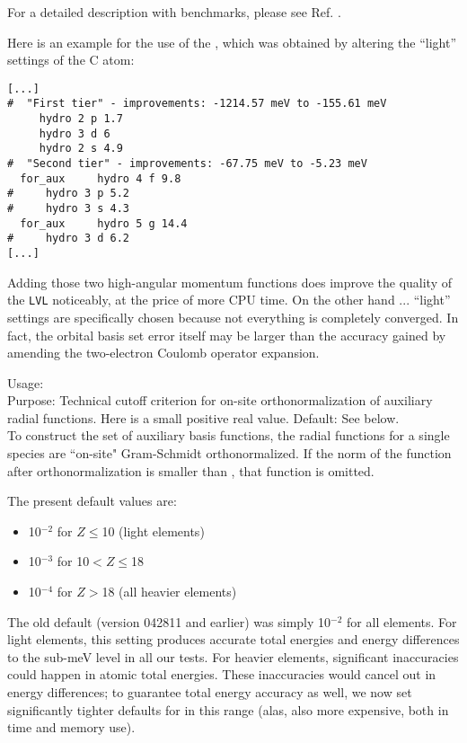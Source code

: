 For a detailed description with benchmarks, please see
Ref. \cite{Ihrig2015}. 

Here is an example for the use of the ,
which was obtained by altering the ``light'' settings of the C atom:

\small
\begin{verbatim}
[...]
#  "First tier" - improvements: -1214.57 meV to -155.61 meV
     hydro 2 p 1.7
     hydro 3 d 6
     hydro 2 s 4.9
#  "Second tier" - improvements: -67.75 meV to -5.23 meV
  for_aux     hydro 4 f 9.8
#     hydro 3 p 5.2
#     hydro 3 s 4.3
  for_aux     hydro 5 g 14.4
#     hydro 3 d 6.2
[...]
\end{verbatim}
\normalsize

Adding those two high-angular momentum functions does improve the
quality of the  \texttt{LVL} noticeably, at the
price of more CPU time. On the other hand ... ``light'' settings are
specifically chosen because not everything is completely converged. In
fact, the orbital basis set error itself may be larger than the
accuracy gained by amending the two-electron Coulomb operator
expansion. 

{
  \noindent
  Usage:   \\[1.0ex]
  Purpose: Technical cutoff criterion for on-site orthonormalization
    of auxiliary radial functions. Here  is a small 
    positive real value. Default: See below. \\
}
To construct the set of auxiliary basis functions, the radial functions for 
a single species are ``on-site" Gram-Schmidt orthonormalized. If 
 the norm of the function after
  orthonormalization is smaller than , that function
  is omitted.

The present default values are:
\begin{itemize}
  \item 10$^{-2}$ for $Z \le$10 (light elements)
  \item 10$^{-3}$ for 10$< Z \le$18
  \item 10$^{-4}$ for $Z >$18 (all heavier elements)
\end{itemize}
The old default (version 042811 and earlier) was simply 10$^{-2}$ for
all elements. For light elements, this setting produces accurate total
energies and energy differences to the sub-meV level in all our
tests. For heavier elements, significant inaccuracies could happen in
atomic total energies. These inaccuracies would cancel out in energy
differences; to guarantee total energy accuracy as well, we now set
significantly tighter defaults for 
in this range (alas, also more expensive, both in time and memory use).

